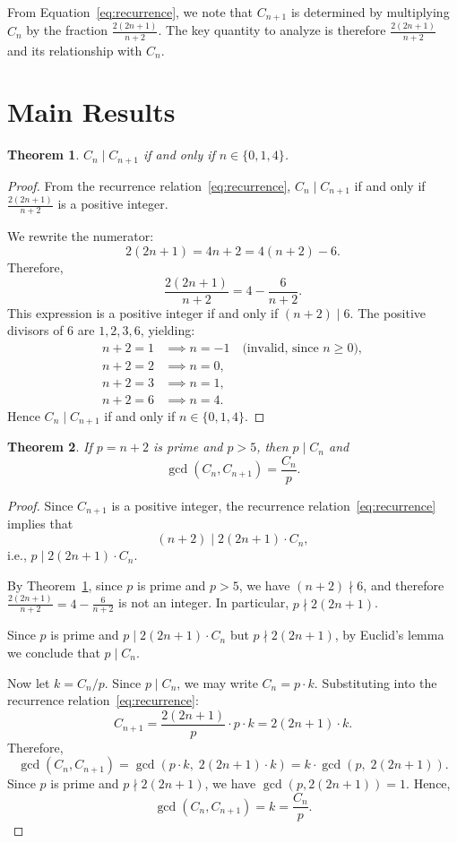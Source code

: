 \documentclass[12pt]{article}
\newtheorem{theorem}{Theorem}
\theoremstyle{definition}
\theoremstyle{remark}
\begin{document}
From Equation~\eqref{eq:recurrence}, we note that $C_{n+1}$ is determined by multiplying $C_n$ by the fraction $\frac{2(2n+1)}{n+2}$. The key quantity to analyze is therefore $\frac{2(2n+1)}{n+2}$ and its relationship with $C_n$.

\section{Main Results}

\begin{theorem}\label{thm:divisibility}
$C_n \mid C_{n+1}$ if and only if $n \in \{0, 1, 4\}$.
\end{theorem}

\begin{proof}
From the recurrence relation~\eqref{eq:recurrence}, $C_n \mid C_{n+1}$ if and only if $\frac{2(2n+1)}{n+2}$ is a positive integer.

We rewrite the numerator:
\[
2(2n+1) = 4n + 2 = 4(n+2) - 6.
\]
Therefore,
\[
\frac{2(2n+1)}{n+2} = 4 - \frac{6}{n+2}.
\]
This expression is a positive integer if and only if $(n+2) \mid 6$. The positive divisors of $6$ are $1, 2, 3, 6$, yielding:
\begin{align*}
n + 2 = 1 &\implies n = -1 \quad \text{(invalid, since } n \geq 0\text{)}, \\
n + 2 = 2 &\implies n = 0, \\
n + 2 = 3 &\implies n = 1, \\
n + 2 = 6 &\implies n = 4.
\end{align*}
Hence $C_n \mid C_{n+1}$ if and only if $n \in \{0, 1, 4\}$.
\end{proof}

\newpage
\begin{theorem}\label{thm:prime}
If $p = n + 2$ is prime and $p > 5$, then $p \mid C_n$ and
\[
\gcd(C_n, C_{n+1}) = \frac{C_n}{p}.
\]
\end{theorem}

\begin{proof}
Since $C_{n+1}$ is a positive integer, the recurrence relation~\eqref{eq:recurrence} implies that
\[
(n+2) \mid 2(2n+1) \cdot C_n,
\]
i.e., $p \mid 2(2n+1) \cdot C_n$.

By Theorem~\ref{thm:divisibility}, since $p$ is prime and $p > 5$, we have $(n+2) \nmid 6$, and therefore $\frac{2(2n+1)}{n+2} = 4 - \frac{6}{n+2}$ is not an integer. In particular, $p \nmid 2(2n+1)$.

Since $p$ is prime and $p \mid 2(2n+1) \cdot C_n$ but $p \nmid 2(2n+1)$, by Euclid's lemma we conclude that $p \mid C_n$.

Now let $k = C_n / p$. Since $p \mid C_n$, we may write $C_n = p \cdot k$. Substituting into the recurrence relation~\eqref{eq:recurrence}:
\[
C_{n+1} = \frac{2(2n+1)}{p} \cdot p \cdot k = 2(2n+1) \cdot k.
\]
Therefore,
\[
\gcd(C_n, C_{n+1}) = \gcd(p \cdot k,\; 2(2n+1) \cdot k) = k \cdot \gcd(p,\; 2(2n+1)).
\]
Since $p$ is prime and $p \nmid 2(2n+1)$, we have $\gcd(p, 2(2n+1)) = 1$. Hence,
\[
\gcd(C_n, C_{n+1}) = k = \frac{C_n}{p}.
\]
\end{proof}
\end{document}
